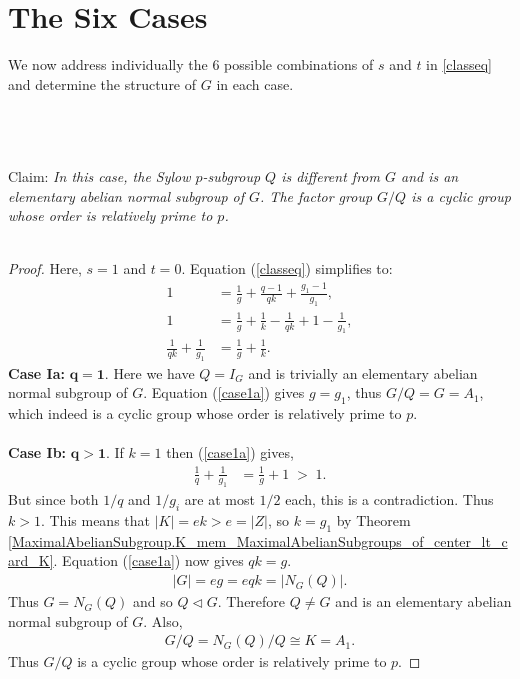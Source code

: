 \section {The Six Cases}

We now address individually the 6 possible combinations of $s$ and $t$ in \eqref{classeq} and determine the structure of $G$ in each case. \\
\\
\begin{theorem}[Case I]\\
\\
Claim: \textit{In this case, the Sylow $p$-subgroup $Q$ is different from $G$ and is an elementary abelian normal subgroup of $G$. The factor group $G/Q$ is a cyclic group whose order is relatively prime to $p$.} \\
\\
\end{theorem}
\begin{proof} Here, $s = 1$ and $t = 0$. Equation (\ref{classeq}) simplifies to:
\begin{align}\label{case1a} 1 &= \frac{1}{g} + \frac{q-1}{qk} + \frac{g_1-1}{g_1}, \nonumber
\\ 1 &= \frac{1}{g} + \frac{1}{k} - \frac{1}{qk}  + 1 - \frac{1}{g_1}, \nonumber
\\ \frac{1}{qk}  + \frac{1}{g_1} &= \frac{1}{g} + \frac{1}{k}.
\end{align}
 \space \textbf{Case Ia:} $\pmb{q = 1}$. Here we have $Q = I_G$ and is trivially an elementary abelian normal subgroup of $G$. Equation (\ref{case1a}) gives $g=g_1$, thus $G/Q = G = A_1$, which indeed is a cyclic group whose order is relatively prime to $p$. \\
\\
 \space \textbf{Case Ib:} $\pmb{q > 1}$. If $k=1$ then (\ref{case1a}) gives,
\begin{align*} \frac{1}{q}  + \frac{1}{g_1} &= \frac{1}{g} + 1 \; > \; 1.
\end{align*}
But since both $1/q$ and $1/g_i$ are at most $1/2$ each, this is a contradiction. Thus $k > 1$. This means that $|K| = ek > e = |Z|$, so $k = g_1$ by Theorem \ref{MaximalAbelianSubgroup.K_mem_MaximalAbelianSubgroups_of_center_lt_card_K}. Equation (\ref{case1a}) now gives $qk = g$.
\begin{align*} |G| = eg = eqk = |N_G(Q)|.
\end{align*}
Thus $G = N_G(Q)$ and so $Q \vartriangleleft G$. Therefore $Q \neq G$ and is an elementary abelian normal subgroup of $G$. Also,
\begin{align*} G/Q = N_G(Q)/Q \cong K = A_1.
\end{align*}
Thus $G/Q$ is a cyclic group whose order is relatively prime to $p$.

\end{proof}

